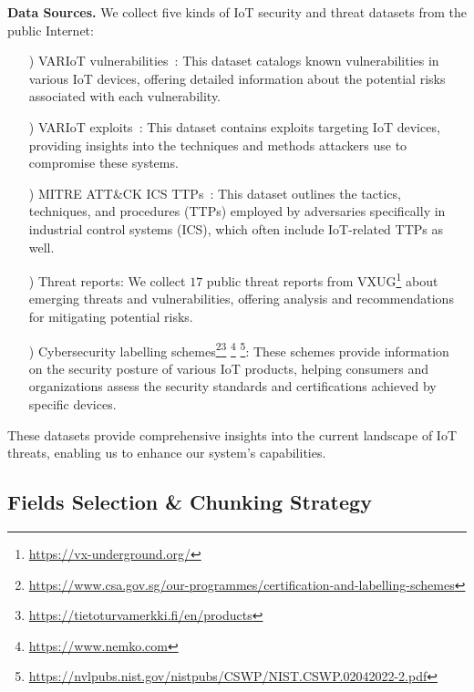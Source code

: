\smallskip
\noindent \textbf{Data Sources.}
We collect five kinds of IoT security and threat datasets from the public Internet:
\begin{itemize}
\item[\romannumeral1)] VARIoT vulnerabilities~\cite{VARIoT_db}: This dataset catalogs known vulnerabilities in various IoT devices, offering detailed information about the potential risks associated with each vulnerability.
\item[\romannumeral2)] VARIoT exploits~\cite{VARIoT_db}: This dataset contains exploits targeting IoT devices, providing insights into the techniques and methods attackers use to compromise these systems.
\item[\romannumeral3)] MITRE ATT\&CK ICS TTPs~\cite{strom2018mitre}: This dataset outlines the tactics, techniques, and procedures (TTPs) employed by adversaries specifically in industrial control systems (ICS), which often include IoT-related TTPs as well.
\item[\romannumeral4)] Threat reports: We collect $17$ public threat reports from VXUG\footnote{\scriptsize \url{https://vx-underground.org/}} about emerging threats and vulnerabilities, offering analysis and recommendations for mitigating potential risks.
\item[\romannumeral5)] Cybersecurity labelling schemes\footnote{\scriptsize \url{https://www.csa.gov.sg/our-programmes/certification-and-labelling-schemes}}\footnote{\scriptsize \url{https://tietoturvamerkki.fi/en/products}}
\footnote{\scriptsize \url{https://www.nemko.com}}
\footnote{\scriptsize \url{https://nvlpubs.nist.gov/nistpubs/CSWP/NIST.CSWP.02042022-2.pdf}}: These schemes provide information on the security posture of various IoT products, helping consumers and organizations assess the security standards and certifications achieved by specific devices.
\end{itemize}
These datasets provide comprehensive insights into the current landscape of IoT threats, enabling us to enhance our system's capabilities.




\subsection{Fields Selection \& Chunking Strategy}\label{sec:exp-dataprocess}

